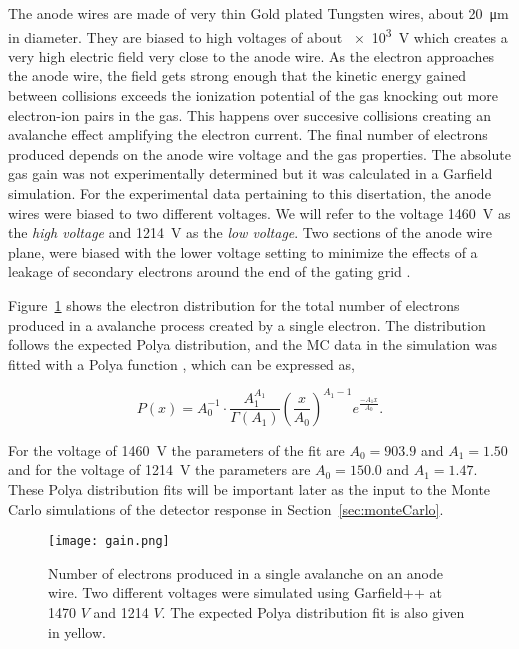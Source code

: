 The anode wires are made of very thin Gold plated Tungsten wires, about \SI{20}{\micro\metre} in diameter. They are biased to high voltages of about  \SI{e3}{\volt} which creates a very high electric field very close to the anode wire. As the electron approaches the anode wire, the field gets strong enough that the kinetic energy gained between collisions exceeds the ionization potential of the gas knocking out more electron-ion pairs in the gas. This happens over succesive  collisions creating an avalanche effect amplifying the electron current.  The final number of electrons produced depends on the anode wire voltage and the gas properties. The absolute gas gain was not experimentally determined but it was calculated in a Garfield simulation. For the experimental data pertaining to this disertation, the anode wires were biased to two different voltages. We will refer to the voltage \SI{1460}{\volt} as the \emph{high voltage} and \SI{1214}{\volt} as the \emph{low voltage}. Two sections of the anode wire plane, were biased with the lower voltage setting to minimize the effects of a leakage of secondary electrons around the end of the gating grid \cite{jon}.


 Figure~\ref{fig:anodegain} shows the electron distribution for the total number of electrons produced in a avalanche process created by a single electron. The distribution follows the expected Polya distribution, and the MC data in the simulation was fitted with a Polya function \cite{blumrol}, which can be expressed as,

\begin{equation}
P(x) = A_0^{-1}\cdot \frac{A_1^{A_1}}{\Gamma(A_1)} \left(\frac{x}{A_0}\right)^{A_1-1}e^{\frac{-A_1x}{A_0}}.
\end{equation}

For the voltage of \SI{1460}{\volt} the parameters of the fit are $A_0=903.9$ and $A_1=1.50$ and for the voltage of \SI{1214}{\volt} the parameters are $A_0=150.0$ and $A_1=1.47$. These Polya distribution fits will be important later as the input to the Monte Carlo simulations of the detector response in Section~\ref{sec:monteCarlo}.



\begin{figure}[!htb]
\centering
\texttt{[image: gain.png]}
\caption{Number of electrons produced in a single avalanche on an anode wire. Two different voltages were simulated using Garfield++ at 1470 $V$ and 1214 $V$. The expected Polya distribution fit is also given in yellow.}
\label{fig:anodegain}
\end{figure}



